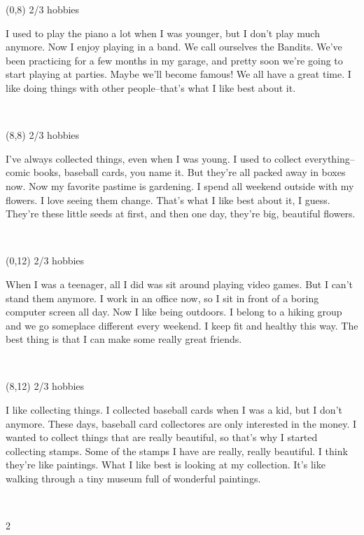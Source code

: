 \documentclass[a4paper]{article}
\newcommand{\mycard}[5]{%
	\vspace{0.1cm}
	\small #1 #2
	\par
	\parbox[t][6.7cm][c]{9.5cm}{%
	\hspace{0.1cm} \large#3 \\
	\normalsize#4 #5
	}
}
\begin{document}
\begin{textblock}{8}(0,8)
\mycard{2/3}{hobbies}{\parbox{9.0cm}{
I used to play the piano a lot when I was younger, but I don't play much anymore. Now I enjoy playing in a band. We call ourselves the Bandits. We've been practicing for a few months in my garage, and pretty soon we're going to start playing at parties. Maybe we'll become famous! We all have a great time. I like doing things with other people--that's what I like best about it.
}}{}{} 
\end{textblock}

\begin{textblock}{8}(8,8)
\mycard{2/3}{hobbies}{\parbox{9.0cm}{
I've always collected things, even when I was young. I used to collect everything--comic books, baseball cards, you name it. But they're all packed away in boxes now. Now my favorite pastime is gardening. I spend all weekend outside with my flowers. I love seeing them change. That's what I like best about it, I guess. They're these little seeds at first, and then one day, they're big, beautiful flowers.
}}{}{} 
\end{textblock}

\begin{textblock}{8}(0,12)
\mycard{2/3}{hobbies}{\parbox{9.0cm}{
When I was a teenager, all I did was sit around playing video games. But I can't stand them anymore. I work in an office now, so I sit in front of a boring computer screen all day. Now I like being outdoors. I belong to a hiking group and we go someplace different every weekend. I keep fit and healthy this way. The best thing is that I can make some really great friends.
}}{}{} 
\end{textblock}

\begin{textblock}{8}(8,12)
\mycard{2/3}{hobbies}{\parbox{9.0cm}{
I like collecting things. I collected baseball cards when I was a kid, but I don't anymore. These days, baseball card collectores are only interested in the money. I wanted to collect things that are really beautiful, so that's why I started collecting stamps. Some of the stamps I have are really, really beautiful. I think they're like paintings. What I like best is looking at my collection. It's like walking through a tiny museum full of wonderful paintings.
}}{}{} 
\end{textblock}

\begin{tiny}2\end{tiny}\\
\newpage
\end{document}
